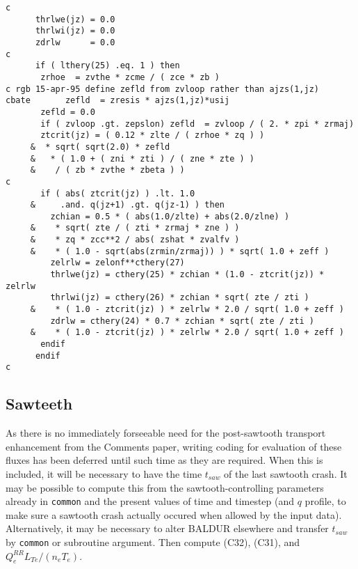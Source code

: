 \begin{verbatim}
c
      thrlwe(jz) = 0.0
      thrlwi(jz) = 0.0
      zdrlw      = 0.0
c
      if ( lthery(25) .eq. 1 ) then
       zrhoe  = zvthe * zcme / ( zce * zb )
c rgb 15-apr-95 define zefld from zvloop rather than ajzs(1,jz)
cbate       zefld  = zresis * ajzs(1,jz)*usij
       zefld = 0.0
       if ( zvloop .gt. zepslon) zefld  = zvloop / ( 2. * zpi * zrmaj)
       ztcrit(jz) = ( 0.12 * zlte / ( zrhoe * zq ) )
     &  * sqrt( sqrt(2.0) * zefld
     &   * ( 1.0 + ( zni * zti ) / ( zne * zte ) )
     &    / ( zb * zvthe * zbeta ) )
c
       if ( abs( ztcrit(jz) ) .lt. 1.0
     &     .and. q(jz+1) .gt. q(jz-1) ) then
         zchian = 0.5 * ( abs(1.0/zlte) + abs(2.0/zlne) )
     &    * sqrt( zte / ( zti * zrmaj * zne ) )
     &    * zq * zcc**2 / abs( zshat * zvalfv )
     &    * ( 1.0 - sqrt(abs(zrmin/zrmaj)) ) * sqrt( 1.0 + zeff )
         zelrlw = zelonf**cthery(27)
         thrlwe(jz) = cthery(25) * zchian * (1.0 - ztcrit(jz)) * zelrlw
         thrlwi(jz) = cthery(26) * zchian * sqrt( zte / zti )
     &    * ( 1.0 - ztcrit(jz) ) * zelrlw * 2.0 / sqrt( 1.0 + zeff )
         zdrlw = cthery(24) * 0.7 * zchian * sqrt( zte / zti )
     &    * ( 1.0 - ztcrit(jz) ) * zelrlw * 2.0 / sqrt( 1.0 + zeff )
       endif
      endif
c
\end{verbatim}


\subsection{Sawteeth}

As there is no immediately forseeable need for the
post-sawtooth transport enhancement from the Comments paper,
writing coding for evaluation of these fluxes
has been deferred until such time as they are required.
When this is included, it will be necessary to
have the time $t_{saw}$ of the last sawtooth crash.
It may be possible to compute this from the sawtooth-controlling
parameters already in {\tt common} and the present values of time and
timestep (and $q$ profile, to make sure a sawtooth crash actually
occured when allowed by the input data).  Alternatively,
it may be necessary to alter BALDUR elsewhere
and transfer $t_{saw}$ by {\tt common} or subroutine argument.
Then compute
(C32), (C31), and $Q_{e}^{RR}L_{Te}/(n_{e}T_{e})$.


